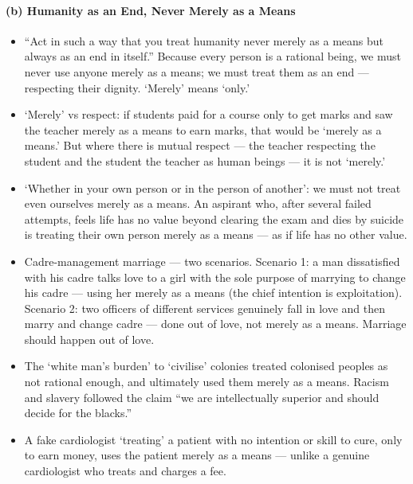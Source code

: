 \paragraph{(b) Humanity as an End, Never Merely as a Means}

\begin{KeyConcept}
\begin{itemize}
\item ``Act in such a way that you treat humanity never merely as a means but always as an end in itself.'' Because every person is a rational being, we must never use anyone merely as a means; we must treat them as an end --- respecting their dignity. `Merely' means `only.'
\item `Merely' vs respect: if students paid for a course only to get marks and saw the teacher merely as a means to earn marks, that would be `merely as a means.' But where there is mutual respect --- the teacher respecting the student and the student the teacher as human beings --- it is not `merely.'
\item `Whether in your own person or in the person of another': we must not treat even ourselves merely as a means. An aspirant who, after several failed attempts, feels life has no value beyond clearing the exam and dies by suicide is treating their own person merely as a means --- as if life has no other value.
\end{itemize}
\end{KeyConcept}

\begin{ExampleBox}
\begin{itemize}
\item Cadre-management marriage --- two scenarios. Scenario 1: a man dissatisfied with his cadre talks love to a girl with the sole purpose of marrying to change his cadre --- using her merely as a means (the chief intention is exploitation). Scenario 2: two officers of different services genuinely fall in love and then marry and change cadre --- done out of love, not merely as a means. Marriage should happen out of love.
\item The `white man's burden' to `civilise' colonies treated colonised peoples as not rational enough, and ultimately used them merely as a means. Racism and slavery followed the claim ``we are intellectually superior and should decide for the blacks.''
\item A fake cardiologist `treating' a patient with no intention or skill to cure, only to earn money, uses the patient merely as a means --- unlike a genuine cardiologist who treats and charges a fee.
\end{itemize}
\end{ExampleBox}

